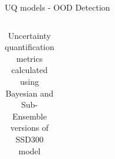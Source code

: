 \documentclass[10pt, aspectratio=169]{beamer}
\begin{document}
\begin{frame}[allowframebreaks]{UQ models - OOD Detection}
\pagebreak
\begin{columns}
    \begin{table}[H]
        \centering
        \footnotesize
        \caption{Uncertainty quantification metrics calculated using Bayesian and Sub-Ensemble versions of SSD300 model}
        \label{tab:my-table}
        \begin{tabular}{llll}

\end{tabular}
\end{table}
\end{columns}
\end{frame}
\end{document}
